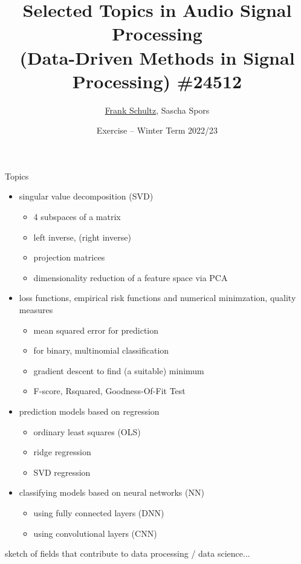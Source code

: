 \documentclass[mathserif, aspectratio=43]{intbeamer}
\title[STiASP \#24512 - Exercise]%
{Selected Topics in Audio Signal Processing\\(Data-Driven Methods in Signal Processing) \#24512}
\author[Schultz, Spors]{%
    \underline{Frank Schultz}, Sascha Spors}
\date[Winter Term 2022/23]{%
  Exercise -- Winter Term 2022/23}
\institute[]{Research Group Signal Processing and Virtual Acoustics,
University of Rostock}
\begin{document}
\maketitle
%
%
%

%
%
%

\begin{frame}{Topics}
\begin{itemize}
\item singular value decomposition (SVD)
  \begin{itemize}
  \item 4 subspaces of a matrix
  \item left inverse, (right inverse)
  \item projection matrices
  \item dimensionality reduction of a feature space via PCA
  \end{itemize}
\item loss functions, empirical risk functions and numerical minimzation, quality measures
\begin{itemize}
\item mean squared error for prediction
\item for binary, multinomial classification
\item gradient descent to find (a suitable) minimum
\item F-score, Rsquared, Goodness-Of-Fit Test
\end{itemize}
\item prediction models based on regression
    \begin{itemize}
    \item ordinary least squares (OLS)
    \item ridge regression
    \item SVD regression
    \end{itemize}
\item classifying models based on neural networks (NN)
  \begin{itemize}
  \item using fully connected layers (DNN)
  \item using convolutional layers (CNN)
  \end{itemize}
\end{itemize}
sketch of fields that contribute to data processing / data science...
\end{frame}
%
%
%
\end{document}
